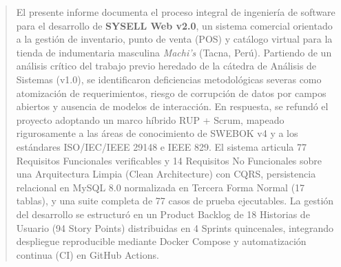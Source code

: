 \documentclass[11pt,a4paper,oneside]{report}
\begin{document}


\setcounter{page}{2}

\begin{abstract}
\noindent El presente informe documenta el proceso integral de ingeniería de software para el desarrollo de \textbf{SYSELL Web v2.0}, un sistema comercial orientado a la gestión de inventario, punto de venta (POS) y catálogo virtual para la tienda de indumentaria masculina \textit{Machi's} (Tacna, Perú). Partiendo de un análisis crítico del trabajo previo heredado de la cátedra de Análisis de Sistemas (v1.0), se identificaron deficiencias metodológicas severas como atomización de requerimientos, riesgo de corrupción de datos por campos abiertos y ausencia de modelos de interacción. En respuesta, se refundó el proyecto adoptando un marco híbrido RUP + Scrum, mapeado rigurosamente a las áreas de conocimiento de SWEBOK v4 y a los estándares ISO/IEC/IEEE 29148 e IEEE 829. El sistema articula 77 Requisitos Funcionales verificables y 14 Requisitos No Funcionales sobre una Arquitectura Limpia (Clean Architecture) con CQRS, persistencia relacional en MySQL 8.0 normalizada en Tercera Forma Normal (17 tablas), y una suite completa de 77 casos de prueba ejecutables. La gestión del desarrollo se estructuró en un Product Backlog de 18 Historias de Usuario (94 Story Points) distribuidas en 4 Sprints quincenales, integrando despliegue reproducible mediante Docker Compose y automatización continua (CI) en GitHub Actions.
\end{abstract}

\tableofcontents
\listoffigures
\listoftables
\clearpage












\end{document}
